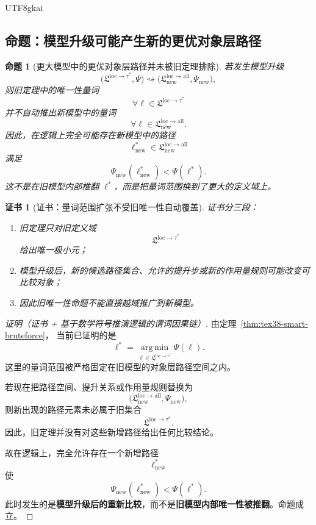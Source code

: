 \documentclass[12pt]{article}
\newtheorem{proposition}{命题}[section]
\newtheorem{Certificate}{证书}[section]
\begin{document}
\begin{CJK*}{UTF8}{gkai}
\subsection{命题：模型升级可能产生新的更优对象层路径}
\label{subsec:tex38-smart-upgrade}

\begin{proposition}[更大模型中的更优对象层路径并未被旧定理排除]
\label{prop:tex38-smart-upgrade}
若发生模型升级
\[
  \bigl(\mathfrak L^{\mathrm{loc}\to\tau^\ast},\Psi\bigr)
  \rightsquigarrow
  \bigl(\mathfrak L_{\mathrm{new}}^{\mathrm{loc}\to\mathrm{all}},\Psi_{\mathrm{new}}\bigr),
\]
则旧定理中的唯一性量词
\[
  \forall \ell\in\mathfrak L^{\mathrm{loc}\to\tau^\ast}
\]
并不自动推出新模型中的量词
\[
  \forall \ell\in\mathfrak L_{\mathrm{new}}^{\mathrm{loc}\to\mathrm{all}}.
\]
因此，在逻辑上完全可能存在新模型中的路径
\[
  \ell_{\mathrm{new}}^\ast\in
  \mathfrak L_{\mathrm{new}}^{\mathrm{loc}\to\mathrm{all}}
\]
满足
\[
  \Psi_{\mathrm{new}}(\ell_{\mathrm{new}}^\ast)
  <
  \Psi(\ell^\ast).
\]
这不是在旧模型内部推翻 $\ell^\ast$，而是把量词范围换到了更大的定义域上。
\end{proposition}

\begin{Certificate}[证书：量词范围扩张不受旧唯一性自动覆盖]
\label{cert:tex38-smart-upgrade}
证书分三段：
\begin{enumerate}
  \item 旧定理只对旧定义域
  \[
    \mathfrak L^{\mathrm{loc}\to\tau^\ast}
  \]
  给出唯一极小元；
  \item 模型升级后，新的候选路径集合、允许的提升步或新的作用量规则可能改变可比较对象；
  \item 因此旧唯一性命题不能直接越域推广到新模型。
\end{enumerate}
\end{Certificate}

\begin{proof}[证明（证书 + 基于数学符号推演逻辑的谓词因果链）]
由定理~\ref{thm:tex38-smart-bruteforce}，
当前已证明的是
\[
  \ell^\ast
  =
  \operatorname*{arg\,min}_{\ell\in\mathfrak L^{\mathrm{loc}\to\tau^\ast}}
  \Psi(\ell).
\]
这里的量词范围被严格固定在旧模型的对象层路径空间之内。

若现在把路径空间、提升关系或作用量规则替换为
\[
  \bigl(\mathfrak L_{\mathrm{new}}^{\mathrm{loc}\to\mathrm{all}},\Psi_{\mathrm{new}}\bigr),
\]
则新出现的路径元素未必属于旧集合
\[
  \mathfrak L^{\mathrm{loc}\to\tau^\ast}.
\]
因此，旧定理并没有对这些新增路径给出任何比较结论。

故在逻辑上，完全允许存在一个新增路径
\[
  \ell_{\mathrm{new}}^\ast
\]
使
\[
  \Psi_{\mathrm{new}}(\ell_{\mathrm{new}}^\ast)
  <
  \Psi(\ell^\ast).
\]
此时发生的是\textbf{模型升级后的重新比较}，而不是\textbf{旧模型内部唯一性被推翻}。命题成立。
\end{proof}


\end{CJK*}
\end{document}
